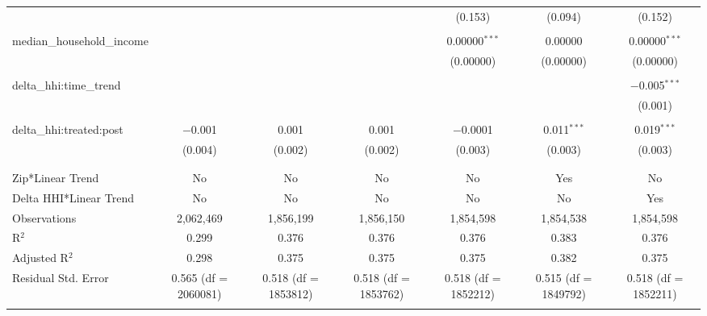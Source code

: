 \begin{table}[H]
{\begin{tabular}{@{\extracolsep{5pt}}lcccccc}
   &  &  &  & (0.153) & (0.094) & (0.152) \\  

   & & & & & & \\  

  median\_household\_income &  &  &  & 0.00000$^{***}$ & 0.00000 & 0.00000$^{***}$ \\  

   &  &  &  & (0.00000) & (0.00000) & (0.00000) \\  

   & & & & & & \\  

  delta\_hhi:time\_trend &  &  &  &  &  & $-$0.005$^{***}$ \\  

   &  &  &  &  &  & (0.001) \\  

   & & & & & & \\  

  delta\_hhi:treated:post & $-$0.001 & 0.001 & 0.001 & $-$0.0001 & 0.011$^{***}$ & 0.019$^{***}$ \\  

   & (0.004) & (0.002) & (0.002) & (0.003) & (0.003) & (0.003) \\  

   & & & & & & \\  

 \hline \\[-1.8ex]  

 Zip*Linear Trend & No & No & No & No & Yes & No \\  

 Delta HHI*Linear Trend & No & No & No & No & No & Yes \\  

 Observations & 2,062,469 & 1,856,199 & 1,856,150 & 1,854,598 & 1,854,538 & 1,854,598 \\  

 R$^{2}$ & 0.299 & 0.376 & 0.376 & 0.376 & 0.383 & 0.376 \\  

 Adjusted R$^{2}$ & 0.298 & 0.375 & 0.375 & 0.375 & 0.382 & 0.375 \\  

 Residual Std. Error & 0.565 (df = 2060081) & 0.518 (df = 1853812) & 0.518 (df = 1853762) & 0.518 (df = 1852212) & 0.515 (df = 1849792) & 0.518 (df = 1852211) \\  

 \hline  

 \hline \\[-1.8ex]  


\end{tabular}}
\end{table}
